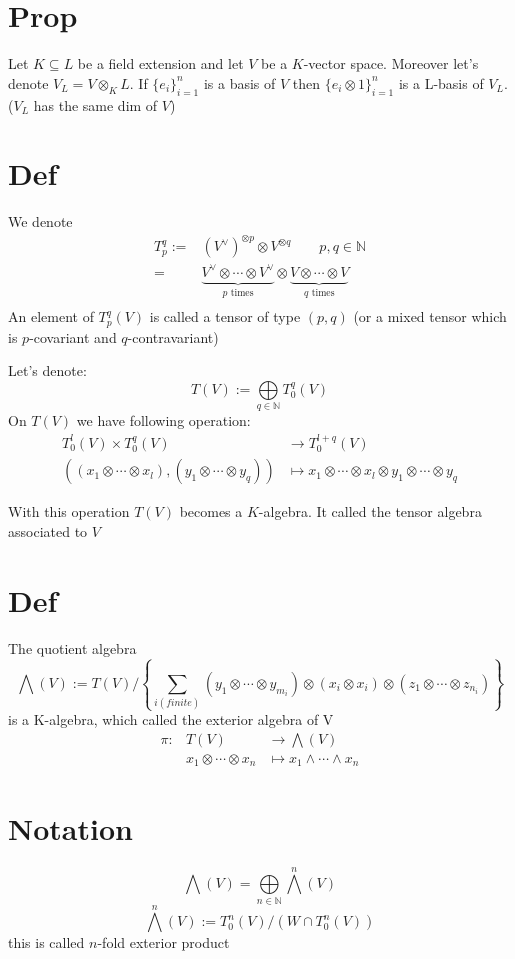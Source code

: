 \documentclass{book}
\begin{document}
\section{Prop}
Let $K\subseteq L$ be a field extension and let $V$ be a $K$-vector space. Moreover let's denote $V_L=V\otimes_KL$. If $\{e_i\}_{i=1}^n$ is a basis of $V$ then $\{e_i\otimes 1\}_{i=1}^n$ is a L-basis of $V_L$.($V_L$ has the same dim of $V$)
\section{Def}
We denote
$$
\begin{aligned}
    T_p^q:=&(V^\vee)^{\otimes p}\otimes V^{\otimes q}\qquad p,q\in \mathbb{N}\\
    =&\underbrace{V^\vee\otimes\cdots\otimes V^\vee}\limits_{p\text{ times}}\otimes \underbrace{V\otimes\cdots\otimes V}\limits_{q\text{ times}}\\
\end{aligned}
$$
An element of $T_p^q(V)$ is called a tensor of type $(p,q)$ (or a mixed tensor which is $p$-covariant and $q$-contravariant)

Let's denote:
$$T(V):=\bigoplus\limits_{q\in \mathbb{N}} T_0^q(V)$$
On $T(V)$ we have following operation:
$$
\begin{aligned}
    T_0^l(V)\times T_0^q(V)&\rightarrow T_0^{l+q}(V)\\
    ((x_1\otimes\cdots\otimes x_l),(y_1\otimes\cdots\otimes y_q))&\mapsto x_1\otimes\cdots\otimes x_l\otimes y_1\otimes\cdots\otimes y_q
\end{aligned}
$$

With this operation $T(V)$ becomes a $K$-algebra. It called the tensor algebra associated to $V$

\section{Def}
The quotient algebra $$\bigwedge(V):=T(V)/\left\{\sum\limits_{i(finite)}(y_1\otimes\cdots\otimes y_{m_i})\otimes(x_i\otimes x_i)\otimes(z_1\otimes\cdots\otimes z_{n_i})\right\}$$
is a K-algebra, which called the exterior algebra of V
$$
\begin{aligned}
    \pi: &T(V) &\rightarrow \bigwedge(V)\\
    &x_1\otimes\cdots\otimes x_n &\mapsto x_1\wedge\cdots\wedge x_n
\end{aligned}$$
\section{Notation}
$$\bigwedge(V)=\bigoplus \limits_{n\in\mathbb{N}} \bigwedge^n(V)$$
$$\bigwedge^n(V):=T^n_0(V)/(W\cap T_0^n(V))$$
this is called $n$-fold exterior product
\end{document}
